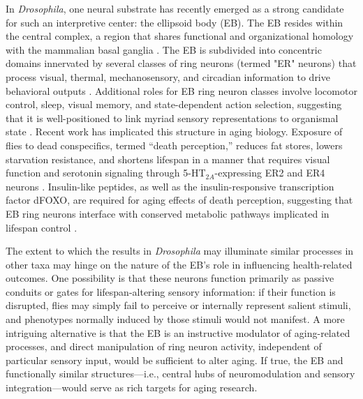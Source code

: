 In \textit{Drosophila}, one neural substrate has recently emerged as a strong candidate for such an interpretive center: the ellipsoid body (EB). 
The EB resides within the central complex, a region that shares functional and organizational homology with the mammalian basal ganglia \citep{strausfeld2013}. 
The EB is subdivided into concentric domains innervated by several classes of ring neurons (termed "ER" neurons) that process visual, thermal, mechanosensory, and circadian information to drive behavioral outputs \citep{hulse2021, buhl2021, yan2023}. 
Additional roles for EB ring neuron classes involve locomotor control, sleep, visual memory, and state-dependent action selection, suggesting that it is well-positioned to link myriad sensory representations to organismal state \citep{ofstad2011, yan2023, buhl2021, kottler2019}.
Recent work has implicated this structure in aging biology.
Exposure of flies to dead conspecifics, termed “death perception,” reduces fat stores, lowers starvation resistance, and shortens lifespan in a manner that requires visual function and serotonin signaling through 5-HT$_{2A}$-expressing ER2 and ER4 neurons \citep{chakraborty2019}.
Insulin-like peptides, as well as the insulin-responsive transcription factor dFOXO, are required for aging effects of death perception, suggesting that EB ring neurons interface with conserved metabolic pathways implicated in lifespan control \citep{gendron2023}. 


The extent to which the results in \textit{Drosophila} may illuminate similar processes in other taxa may hinge on the nature of the EB's role in influencing health-related outcomes. 
One possibility is that these neurons function primarily as passive conduits or gates for lifespan-altering sensory information: if their function is disrupted, flies may simply fail to perceive \citep{seelig2013, omoto2017} or internally represent salient stimuli, and phenotypes normally induced by those stimuli would not manifest. 
A more intriguing alternative is that the EB is an instructive modulator of aging-related processes, and direct manipulation of ring neuron activity, independent of particular sensory input, would be sufficient to alter aging. 
If true, the EB and functionally similar structures---i.e., central hubs of neuromodulation and sensory integration---would serve as rich targets for aging research.


